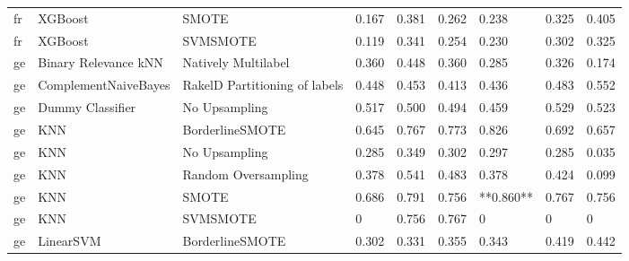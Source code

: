 \begin{tabular}{lllllllll}
      fr &                         XGBoost &                         SMOTE & 0.167 &                     0.381 &                 0.262 &                  0.238 &                                   0.325 &     0.405 \\
      fr &                         XGBoost &                      SVMSMOTE & 0.119 &                     0.341 &                 0.254 &                  0.230 &                                   0.302 &     0.325 \\
      ge &            Binary Relevance kNN &           Natively Multilabel & 0.360 &                     0.448 &                 0.360 &                  0.285 &                                   0.326 &     0.174 \\
      ge &            ComplementNaiveBayes & RakelD Partitioning of labels & 0.448 &                     0.453 &                 0.413 &                  0.436 &                                   0.483 &     0.552 \\
      ge &                Dummy Classifier &                 No Upsampling & 0.517 &                     0.500 &                 0.494 &                  0.459 &                                   0.529 &     0.523 \\
      ge &                             KNN &               BorderlineSMOTE & 0.645 &                     0.767 &                 0.773 &                  0.826 &                                   0.692 &     0.657 \\
      ge &                             KNN &                 No Upsampling & 0.285 &                     0.349 &                 0.302 &                  0.297 &                                   0.285 &     0.035 \\
      ge &                             KNN &           Random Oversampling & 0.378 &                     0.541 &                 0.483 &                  0.378 &                                   0.424 &     0.099 \\
      ge &                             KNN &                         SMOTE & 0.686 &                     0.791 &                 0.756 &              **0.860** &                                   0.767 &     0.756 \\
      ge &                             KNN &                      SVMSMOTE &     0 &                     0.756 &                 0.767 &                      0 &                                       0 &         0 \\
      ge &                       LinearSVM &               BorderlineSMOTE & 0.302 &                     0.331 &                 0.355 &                  0.343 &                                   0.419 &     0.442 \\

\end{tabular}
